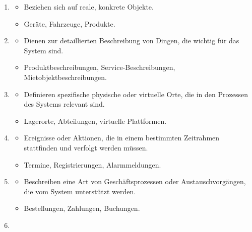 \begin{infoBox}[title=Kategorien konzeptioneller Klassen]
    \begin{enumerate}
        \item {}
        \begin{itemize}
            \item Beziehen sich auf reale, konkrete Objekte.
            \item {} Geräte, Fahrzeuge, Produkte.
        \end{itemize}
        \item {}
        \begin{itemize}
            \item Dienen zur detaillierten Beschreibung von Dingen, die wichtig für das System sind.
            \item {} Produktbeschreibungen, Service-Beschreibungen, Mietobjektbeschreibungen.
        \end{itemize}
        \item {}
        \begin{itemize}
            \item Definieren spezifische physische oder virtuelle Orte, die in den Prozessen des Systems relevant sind.
            \item {} Lagerorte, Abteilungen, virtuelle Plattformen.
        \end{itemize}
        \item {}
        \begin{itemize}
            \item Ereignisse oder Aktionen, die in einem bestimmten Zeitrahmen stattfinden und verfolgt werden müssen.
            \item {} Termine, Registrierungen, Alarmmeldungen.
        \end{itemize}
        \item {}
        \begin{itemize}
            \item Beschreiben eine Art von Geschäftsprozessen oder Austauschvorgängen, die vom System unterstützt werden.
            \item {} Bestellungen, Zahlungen, Buchungen.
        \end{itemize}
        \item {}

\end{enumerate}
\end{infoBox}
